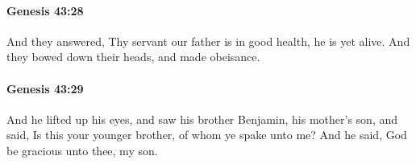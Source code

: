 		\paragraph{Genesis 43:28} %
			\label{GENESIS-43-28}

			And they answered, Thy servant our father is in good health, he is yet alive. And they bowed down their heads, and made obeisance.


		\paragraph{Genesis 43:29} %
			\label{GENESIS-43-29}

			And he lifted up his eyes, and saw his brother Benjamin, his mother's son, and said, Is this your younger brother, of whom ye spake unto me? And he said, God be gracious unto thee, my son.


